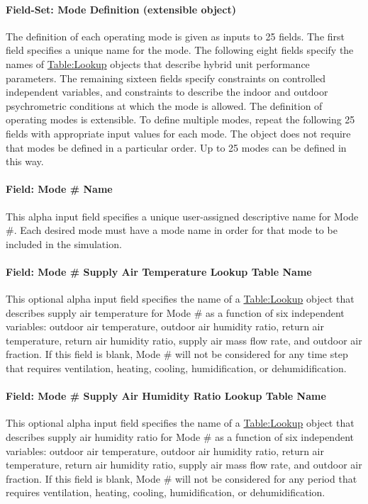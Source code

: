 \paragraph{Field-Set: Mode Definition (extensible object)}
The definition of each operating mode is given as inputs to 25 fields. The first field specifies a unique name for the mode. The following eight fields specify the names of \hyperref[tablelookup]{Table:Lookup} objects that describe hybrid unit performance parameters. The remaining sixteen fields specify constraints on controlled independent variables, and constraints to describe the indoor and outdoor psychrometric conditions at which the mode is allowed. The definition of operating modes is extensible. To define multiple modes, repeat the following 25 fields with appropriate input values for each mode. The object does not require that modes be defined in a particular order. Up to 25 modes can be defined in this way.

\paragraph{Field: Mode \# Name}
This alpha input field specifies a unique user-assigned descriptive name for Mode \#. Each desired mode must have a mode name in order for that mode to be included in the simulation.

\paragraph{Field: Mode \# Supply Air Temperature Lookup Table Name}
This optional alpha input field specifies the name of a \hyperref[tablelookup]{Table:Lookup} object that describes supply air temperature for Mode \# as a function of six independent variables: outdoor air temperature, outdoor air humidity ratio, return air temperature, return air humidity ratio, supply air mass flow rate, and outdoor air fraction. If this field is blank, Mode \# will not be considered for any time step that requires ventilation, heating, cooling, humidification, or dehumidification.

\paragraph{Field: Mode \# Supply Air Humidity Ratio Lookup Table Name}
This optional alpha input field specifies the name of a \hyperref[tablelookup]{Table:Lookup} object that describes supply air humidity ratio for Mode \# as a function of six independent variables: outdoor air temperature, outdoor air humidity ratio, return air temperature, return air humidity ratio, supply air mass flow rate, and outdoor air fraction. If this field is blank, Mode \# will not be considered for any period that requires ventilation, heating, cooling, humidification, or dehumidification.

